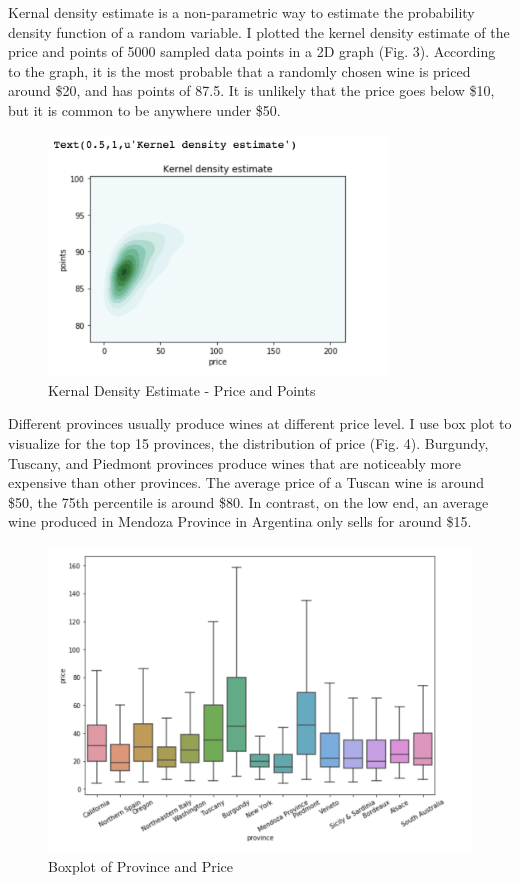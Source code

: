 \documentclass{article}
\begin{document}
Kernal density estimate is a non-parametric way to estimate the probability density function of a random variable. I plotted the kernel density estimate of the price and points of 5000 sampled data points in a 2D graph (Fig. 3). According to the graph, it is the most probable that a randomly chosen wine is priced around \$20, and has points of 87.5. It is unlikely that the price goes below \$10, but it is common to be anywhere under \$50. 
\begin{figure}[H]
\caption{Kernal Density Estimate - Price and Points}
\centering
\includegraphics[width=0.8\textwidth]{graphs/kernal_density_estimate}
\end{figure}

Different provinces usually produce wines at different price level. I use box plot to visualize for the top 15 provinces, the distribution of price (Fig. 4). Burgundy, Tuscany, and Piedmont provinces produce wines that are noticeably more expensive than other provinces. The average price of a Tuscan wine is around \$50, the 75th percentile is around \$80. In contrast, on the low end, an average wine produced in Mendoza Province in Argentina only sells for around \$15.

\begin{figure}[H]
\caption{Boxplot of Province and Price}
\centering
\includegraphics[width=1\textwidth]{graphs/province_price_boxplot}
\end{figure}
\end{document}
